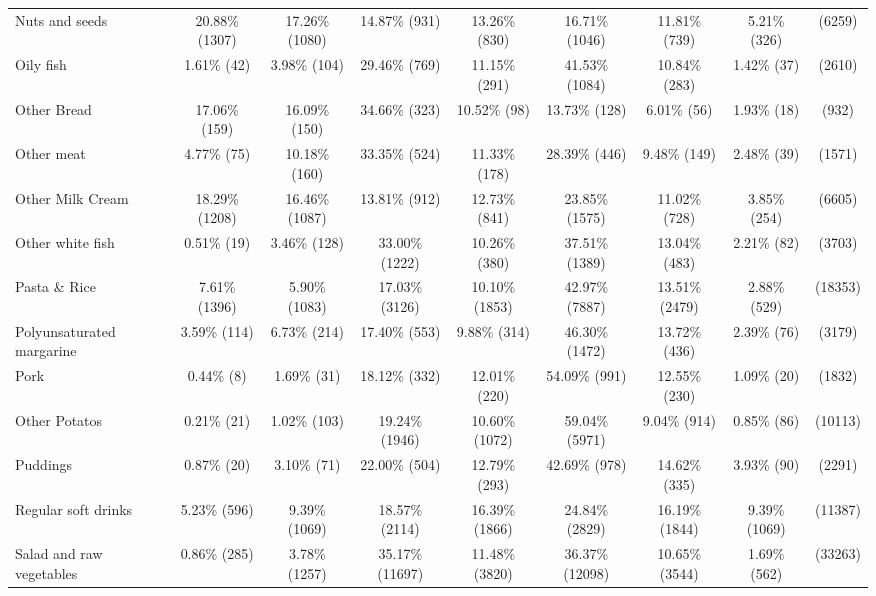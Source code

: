 \documentclass[utf8]{frontiers_suppmat} %
\begin{document}
\begin{table}[]
{\begin{tabular}{@{}lcccccccc@{}}
Nuts and seeds            & 20.88\%   (1307) & 17.26\%   (1080) & 14.87\%    (931) & 13.26\%   (830) & 16.71\%   (1046) & 11.81\%   (739) & 5.21\%   (326)  &    (6259) \\
Oily fish                 & 1.61\%     (42)  & 3.98\%    (104)  & 29.46\%    (769) & 11.15\%   (291) & 41.53\%   (1084) & 10.84\%   (283) & 1.42\%    (37)  &    (2610) \\
Other Bread               & 17.06\%    (159) & 16.09\%    (150) & 34.66\%    (323) & 10.52\%    (98) & 13.73\%    (128) & 6.01\%    (56)  & 1.93\%    (18)  &     (932) \\
Other meat                & 4.77\%     (75)  & 10.18\%    (160) & 33.35\%    (524) & 11.33\%   (178) & 28.39\%    (446) & 9.48\%   (149)  & 2.48\%    (39)  &    (1571) \\
Other Milk Cream          & 18.29\%   (1208) & 16.46\%   (1087) & 13.81\%    (912) & 12.73\%   (841) & 23.85\%   (1575) & 11.02\%   (728) & 3.85\%   (254)  &    (6605) \\
Other white fish          & 0.51\%     (19)  & 3.46\%    (128)  & 33.00\%   (1222) & 10.26\%   (380) & 37.51\%   (1389) & 13.04\%   (483) & 2.21\%    (82)  &    (3703) \\
Pasta \& Rice             & 7.61\%   (1396)  & 5.90\%   (1083)  & 17.03\%   (3126) & 10.10\%  (1853) & 42.97\%   (7887) & 13.51\%  (2479) & 2.88\%   (529)  &   (18353) \\
Polyunsaturated margarine & 3.59\%    (114)  & 6.73\%    (214)  & 17.40\%    (553) & 9.88\%   (314)  & 46.30\%   (1472) & 13.72\%   (436) & 2.39\%    (76)  &    (3179) \\
Pork                      & 0.44\%      (8)  & 1.69\%     (31)  & 18.12\%    (332) & 12.01\%   (220) & 54.09\%    (991) & 12.55\%   (230) & 1.09\%    (20)  &    (1832) \\
Other Potatos             & 0.21\%     (21)  & 1.02\%    (103)  & 19.24\%   (1946) & 10.60\%  (1072) & 59.04\%   (5971) & 9.04\%   (914)  & 0.85\%    (86)  &   (10113) \\
Puddings                  & 0.87\%     (20)  & 3.10\%     (71)  & 22.00\%    (504) & 12.79\%   (293) & 42.69\%    (978) & 14.62\%   (335) & 3.93\%    (90)  &    (2291) \\
Regular soft drinks       & 5.23\%    (596)  & 9.39\%   (1069)  & 18.57\%   (2114) & 16.39\%  (1866) & 24.84\%   (2829) & 16.19\%  (1844) & 9.39\%  (1069)  &   (11387) \\
Salad and raw vegetables  & 0.86\%    (285)  & 3.78\%   (1257)  & 35.17\%  (11697) & 11.48\%  (3820) & 36.37\%  (12098) & 10.65\%  (3544) & 1.69\%   (562)  &   (33263) \\

\end{tabular}}
\end{table}
\end{document}
